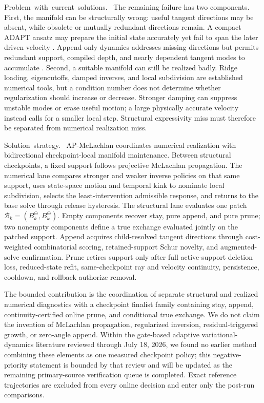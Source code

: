 \documentclass[
  reprint,
  amsmath,
  amssymb,
  aps,
  pra,
  nofootinbib,
  superscriptaddress,
  floatfix
]{revtex4-2}
\newcommand{\tentative}[1]{\textcolor{red!70!black}{#1}}
\newcommand{\structlabel}[1]{\noindent\mbox{\tentative{#1.}}~}
\begin{document}
\structlabel{Problem with current solutions}
The remaining failure has two components.  First, the manifold can be structurally wrong: useful tangent directions may be absent, while obsolete or mutually redundant directions remain.  A compact ADAPT ansatz may prepare the initial state accurately yet fail to span the later driven velocity \cite{Grimsley2019,Tang2021,Yordanov2021}.  Append-only dynamics addresses missing directions but permits redundant support, compiled depth, and nearly dependent tangent modes to accumulate \cite{Yao2021,Linteau2024,Zhang2025}.  Second, a suitable manifold can still be realized badly.  Ridge loading, eigencutoffs, damped inverses, and local subdivision are established numerical tools, but a condition number does not determine whether regularization should increase or decrease.  Stronger damping can suppress unstable modes or erase useful motion; a large physically accurate velocity instead calls for a smaller local step.  Structural expressivity miss must therefore be separated from numerical realization miss.

\structlabel{Solution strategy}
AP-McLachlan coordinates numerical realization with bidirectional checkpoint-local manifold maintenance.  Between structural checkpoints, a fixed support follows projective McLachlan propagation.  The numerical lane compares stronger and weaker inverse policies on that same support, uses state-space motion and temporal kink to nominate local subdivision, selects the least-intervention admissible response, and returns to the base solve through release hysteresis.  The structural lane evaluates one patch $\mathcal B_k=(B_k^{\ominus},B_k^{\oplus})$.  Empty components recover stay, pure append, and pure prune; two nonempty components define a true exchange evaluated jointly on the patched support.  Append acquires child-resolved tangent directions through cost-weighted combinatorial scoring, retained-support Schur novelty, and augmented-solve confirmation.  Prune retires support only after full active-support deletion loss, reduced-state refit, same-checkpoint ray and velocity continuity, persistence, cooldown, and rollback authorize removal.

The bounded contribution is the coordination of separate structural and realized numerical diagnostics with a checkpoint finalist family containing stay, append, continuity-certified online prune, and conditional true exchange.  We do not claim the invention of McLachlan propagation, regularized inversion, residual-triggered growth, or zero-angle append.  Within the gate-based adaptive variational-dynamics literature reviewed through July 18, 2026, we found no earlier method combining these elements as one measured checkpoint policy; this negative-priority statement is bounded by that review and will be updated as the remaining primary-source verification queue is completed.  Exact reference trajectories are excluded from every online decision and enter only the post-run comparisons.
\end{document}
